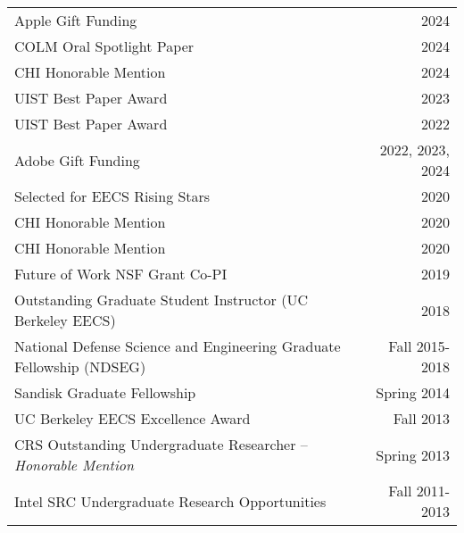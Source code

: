 \begin{longtable}{Xr}
	Apple Gift Funding & 2024 \\
	COLM Oral Spotlight Paper & 2024 \\
	CHI Honorable Mention & 2024 \\
	UIST Best Paper Award & 2023 \\
	UIST Best Paper Award & 2022 \\
	Adobe Gift Funding & 2022, 2023, 2024 \\
	Selected for EECS Rising Stars & 2020 \\
	CHI Honorable Mention & 2020 \\
	CHI Honorable Mention & 2020 \\
	Future of Work NSF Grant Co-PI & 2019 \\
	Outstanding Graduate Student Instructor (UC Berkeley EECS) & 2018 \\
	National Defense Science and Engineering Graduate Fellowship (NDSEG) & Fall 2015-2018 \\
	Sandisk Graduate Fellowship & Spring 2014 \\
	UC Berkeley EECS Excellence Award & Fall 2013 \\
	CRS Outstanding Undergraduate Researcher -- \textit{Honorable Mention} & Spring 2013 \\
	Intel SRC Undergraduate Research Opportunities & Fall 2011-2013 \\
\end{longtable}